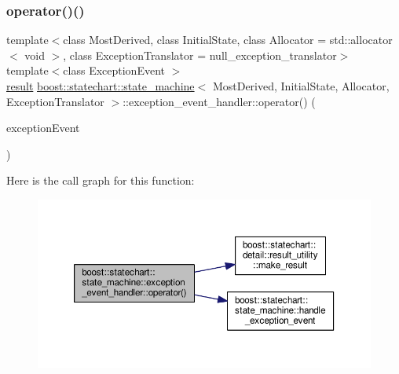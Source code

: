 \subsubsection{\texorpdfstring{operator()()}{operator()()}}
{\footnotesize\ttfamily template$<$class Most\+Derived, class Initial\+State, class Allocator = std\+::allocator$<$ void $>$, class Exception\+Translator = null\+\_\+exception\+\_\+translator$>$ \\
template$<$class Exception\+Event $>$ \\
\mbox{\hyperlink{namespaceboost_1_1statechart_abe807f6598b614d6d87bb951ecd92331}{result}} \mbox{\hyperlink{classboost_1_1statechart_1_1state__machine}{boost\+::statechart\+::state\+\_\+machine}}$<$ Most\+Derived, Initial\+State, Allocator, Exception\+Translator $>$\+::exception\+\_\+event\+\_\+handler\+::operator() (\begin{DoxyParamCaption}\item[{const Exception\+Event \&}]{exception\+Event }\end{DoxyParamCaption})\hspace{0.3cm}{\ttfamily [inline]}}

Here is the call graph for this function\+:
\nopagebreak
\begin{figure}[H]
\begin{center}
\leavevmode
\includegraphics[width=350pt]{classboost_1_1statechart_1_1state__machine_1_1exception__event__handler_ab9b740e63c87c7de5e0890951bdc5e69_cgraph}
\end{center}
\end{figure}
\mbox{\label{classboost_1_1statechart_1_1state__machine_1_1exception__event__handler_aeb4e0a3fcad26c9e187369570563d1dc}} 
